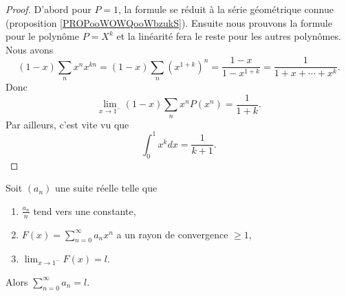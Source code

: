 \begin{proof}
	D'abord pour \( P=1\), la formule se réduit à la série géométrique connue (proposition \ref{PROPooWOWQooWbzukS}). Ensuite nous prouvons la formule pour le polynôme \( P=X^k\) et la linéarité fera le reste pour les autres polynômes. Nous avons
	\begin{equation}
		(1-x)\sum_nx^nx^{kn}=(1-x)\sum_n(x^{1+k})^n=\frac{ 1-x }{ 1-x^{1+k} }=\frac{1}{ 1+x+\cdots+x^k }.
	\end{equation}
	Donc
	\begin{equation}
		\lim_{x\to 1^-} (1-x)\sum_nx^nP(x^n)=\frac{1}{ 1+k }.
	\end{equation}
	Par ailleurs, c'est vite vu que
	\begin{equation}
		\int_0^1 x^kdx=\frac{1}{ k+1 }.
	\end{equation}
\end{proof}

\begin{theorem}      \label{ThoPdDxgP}
	Soit \( (a_n)\) une suite réelle telle que
	\begin{enumerate}
		\item
		      \( \frac{ a_n }{ n }\) tend vers une constante,
		\item
		      \( F(x)=\sum_{n=0}^{\infty}a_nx^n\) a un rayon de convergence \( \geq 1\),
		\item
		      \( \lim_{x\to 1^-} F(x)=l\).
	\end{enumerate}
	Alors \( \sum_{n=0}^{\infty}a_n=l\).
\end{theorem}

